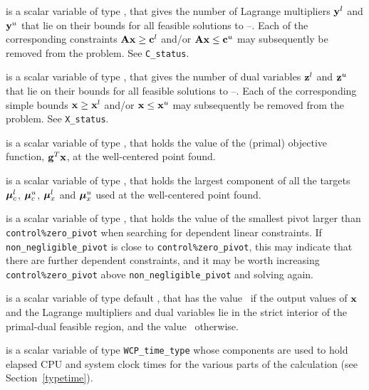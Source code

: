 \documentclass{galahad}
\newcommand{\packagename}{WCP}
\begin{document}
\begin{description}
 is a scalar variable of type \integer, that gives the
number of Lagrange multipliers ${\mathbf{y}}^l$ and ${\mathbf{y}}^u$ that lie on their bounds 
for all feasible solutions to --. Each of the
corresponding constraints ${\mathbf{A}} {\mathbf{x}} \geq {\mathbf{c}}^l$ and/or 
${\mathbf{A}} {\mathbf{x}} \leq {\mathbf{c}}^u$ may subsequently be removed from the problem.
See {\tt C\_status}.

 is a scalar variable of type \integer, that gives the
number of dual variables ${\mathbf{z}}^l$ and ${\mathbf{z}}^u$ that lie on their bounds 
for all feasible solutions to --. Each of the
corresponding simple bounds ${\mathbf{x}} \geq {\mathbf{x}}^l$ and/or 
${\mathbf{x}} \leq {\mathbf{x}}^u$ may subsequently be removed from the problem.
See {\tt X\_status}.

 is a scalar variable of type \realdp, that holds the
value of the (primal) objective function, ${\mathbf{g}}^T {\mathbf{x}}$, 
at the well-centered point found.

 is a scalar variable of type \realdp, 
that holds the largest component of all the targets
$\bm \mu_c^{l}$, $\bm \mu_c^{u}$, $\bm \mu_x^{l}$ and $\bm \mu_x^{u}$ used
at the well-centered point found.

 is a scalar variable of type \realdp, 
that holds the value of the smallest pivot larger than 
{\tt control\%zero\_pivot}
when searching for dependent linear constraints. If 
{\tt non\_negligible\_pivot} is close to  {\tt control\%zero\_pivot},
this may indicate that there are further dependent constraints, and
it may be worth increasing {\tt control\%zero\_pivot} above 
{\tt non\_negligible\_pivot} and solving again.

 is a scalar variable of type default \logical, that has the
value \true\ if the output values of ${\mathbf{x}}$ and the Lagrange multipliers and
dual variables lie in the strict interior of the primal-dual feasible
region, and the value \false\ otherwise.

 is a scalar variable of type {\tt \packagename\_time\_type} 
whose components are used to hold elapsed CPU and system clock times for 
the various parts of the calculation (see Section~\ref{typetime}).


\end{description}
\end{document}
